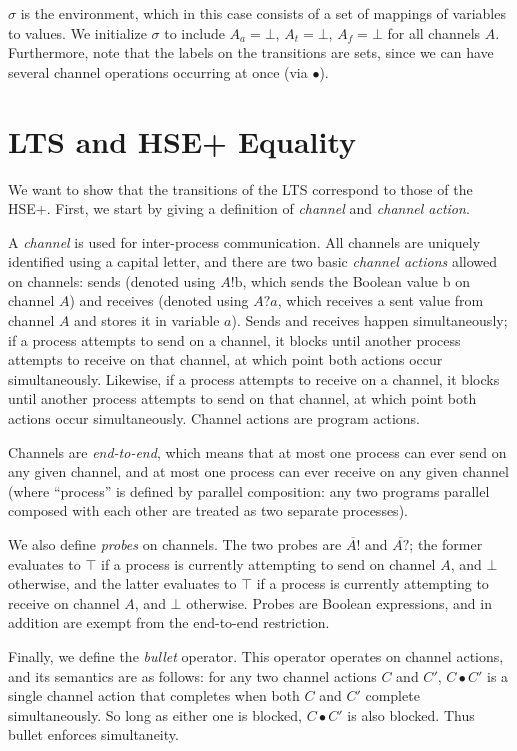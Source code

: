 \documentclass[times, 10pt]{article}
\begin{document}
$\sigma$ is the environment, which in this case consists of a set of mappings of
variables to values.  We initialize $\sigma$ to include $A_a = \bot$, $A_t =
\bot$, $A_f = \bot$ for all channels $A$.  Furthermore, note that the labels on
the transitions are sets, since we can have several channel operations occurring
at once (via $\bullet$).

\section{LTS and HSE+ Equality}

We want to show that the transitions of the LTS correspond to those of the HSE+.
First, we start by giving a definition of \textit{channel} and \textit{channel
action}.

A \textit{channel} is used for inter-process communication. All channels are
uniquely identified using a capital letter, and there are two basic
\textit{channel actions} allowed on channels: sends (denoted using
$A!\mathrm{b}$, which sends the Boolean value b on channel $A$) and receives
(denoted using $A?a$, which receives a sent value from channel $A$ and stores it
in variable $a$). Sends and receives happen simultaneously; if a process
attempts to send on a channel, it blocks until another process attempts to
receive on that channel, at which point both actions occur simultaneously.
Likewise, if a process attempts to receive on a channel, it blocks until another
process attempts to send on that channel, at which point both actions occur
simultaneously. Channel actions are program actions.

Channels are \textit{end-to-end}, which means that at most one process can ever
send on any given channel, and at most one process can ever receive on any given
channel (where ``process'' is defined by parallel composition: any two programs
parallel composed with each other are treated as two separate processes).

We also define \textit{probes} on channels. The two probes are $\overline{A!}$
and $\overline{A?}$; the former evaluates to $\top$ if a process is currently
attempting to send on channel $A$, and $\bot$ otherwise, and the latter
evaluates to $\top$ if a process is currently attempting to receive on channel
$A$, and $\bot$ otherwise. Probes are Boolean expressions, and in addition are
exempt from the end-to-end restriction.

Finally, we define the \textit{bullet} operator. This operator operates on
channel actions, and its semantics are as follows: for any two channel actions
$C$ and $C'$, $C \bullet C'$ is a single channel action that completes when both
$C$ and $C'$ complete simultaneously. So long as either one is blocked, $C
\bullet C'$ is also blocked. Thus bullet enforces simultaneity.
\end{document}
